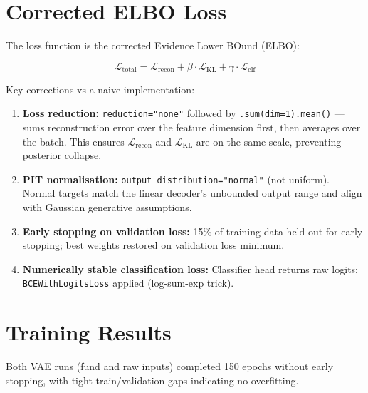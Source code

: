 \documentclass{report}\usepackage[]{graphicx}\usepackage[table]{xcolor}
\begin{document}
\section{Corrected ELBO Loss}

The loss function is the corrected Evidence Lower BOund (ELBO):

\begin{equation}
    \mathcal{L}_{\text{total}} = \mathcal{L}_{\text{recon}} + \beta \cdot \mathcal{L}_{\text{KL}} + \gamma \cdot \mathcal{L}_{\text{clf}}
\end{equation}

\noindent Key corrections vs a naive implementation:

\begin{enumerate}
    \item \textbf{Loss reduction:} \texttt{reduction="none"} followed by 
    \texttt{.sum(dim=1).mean()} — sums reconstruction error over the feature dimension 
    first, then averages over the batch. This ensures $\mathcal{L}_{\text{recon}}$ and 
    $\mathcal{L}_{\text{KL}}$ are on the same scale, preventing posterior collapse.
    
    \item \textbf{PIT normalisation:} \texttt{output\_distribution="normal"} (not uniform). 
    Normal targets match the linear decoder's unbounded output range and align with 
    Gaussian generative assumptions.
    
    \item \textbf{Early stopping on validation loss:} 15\% of training data held out for 
    early stopping; best weights restored on validation loss minimum.
    
    \item \textbf{Numerically stable classification loss:} Classifier head returns raw 
    logits; \texttt{BCEWithLogitsLoss} applied (log-sum-exp trick).
\end{enumerate}

\section{Training Results}

Both VAE runs (fund and raw inputs) completed 150 epochs without early stopping, 
with tight train/validation gaps indicating no overfitting.
\end{document}
